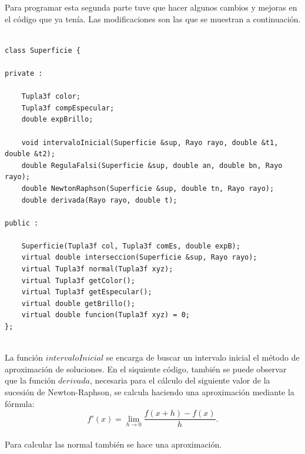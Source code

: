 Para programar esta segunda parte tuve que hacer algunos cambios y mejoras en el código que ya tenía. Las modificaciones son las que se muestran a continuación.
${ }$\\


\begin{lstlisting}[style=Consola]
class Superficie {

private :

	Tupla3f color;
	Tupla3f compEspecular;
	double expBrillo;

	void intervaloInicial(Superficie &sup, Rayo rayo, double &t1, double &t2);
	double RegulaFalsi(Superficie &sup, double an, double bn, Rayo rayo);
	double NewtonRaphson(Superficie &sup, double tn, Rayo rayo);
	double derivada(Rayo rayo, double t);

public :

	Superficie(Tupla3f col, Tupla3f comEs, double expB);
	virtual double interseccion(Superficie &sup, Rayo rayo);
	virtual Tupla3f normal(Tupla3f xyz);
	virtual Tupla3f getColor();
	virtual Tupla3f getEspecular();
	virtual double getBrillo();
	virtual double funcion(Tupla3f xyz) = 0;
};
\end{lstlisting}
${ }$\\


La función $intervaloInicial$ se encarga de buscar un intervalo inicial el método de aproximación de soluciones. En el siquiente código, también se puede observar que la función $derivada$, necesaria para el cálculo del siguiente valor de la sucesión de Newton-Raphson, se calcula haciendo una aproximación mediante la fórmula:
${ }$\\

$$ f'(x) = \lim_{h \to 0} \frac{f(x+h) - f(x)}{h}. $$
${ }$\\

Para calcular las normal también se hace una aproximación.
${ }$\\

